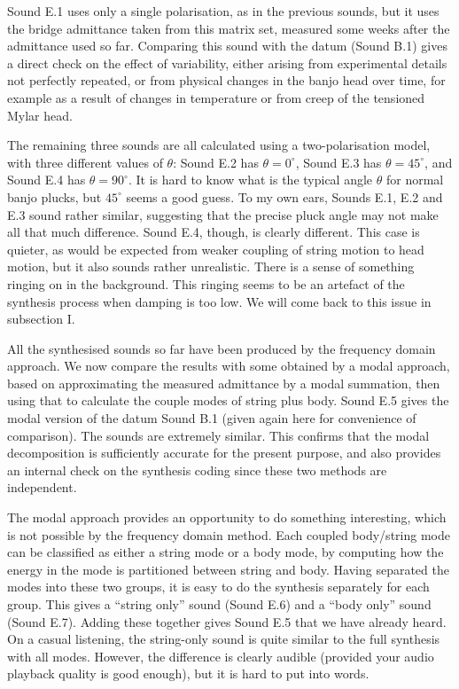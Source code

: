   Sound E.1 uses only a single polarisation, as in the previous sounds, but it 
  uses the bridge admittance taken from this matrix set, measured some weeks 
  after the admittance used so far. Comparing this sound with the datum (Sound 
  B.1) gives a direct check on the effect of variability, either arising from 
  experimental details not perfectly repeated, or from physical changes in the 
  banjo head over time, for example as a result of changes in temperature or 
  from creep of the tensioned Mylar head. 

  The remaining three sounds are all calculated using a two-polarisation model, 
  with three different values of $\theta$: Sound E.2 has $\theta = 0^\circ$, 
  Sound E.3 has $\theta = 45^\circ$, and Sound E.4 has $\theta = 90^\circ$. It 
  is hard to know what is the typical angle $\theta$ for normal banjo plucks, 
  but $45^\circ$ seems a good guess. To my own ears, Sounds E.1, E.2 and E.3 
  sound rather similar, suggesting that the precise pluck angle may not make 
  all that much difference. Sound E.4, though, is clearly different. This case 
  is quieter, as would be expected from weaker coupling of string motion to 
  head motion, but it also sounds rather unrealistic. There is a sense of 
  something ringing on in the background. This ringing seems to be an artefact 
  of the synthesis process when damping is too low. We will come back to this 
  issue in subsection I. 

  All the synthesised sounds so far have been produced by the frequency domain 
  approach. We now compare the results with some obtained by a modal approach, 
  based on approximating the measured admittance by a modal summation, then 
  using that to calculate the couple modes of string plus body. Sound E.5 gives 
  the modal version of the datum Sound B.1 (given again here for convenience of 
  comparison). The sounds are extremely similar. This confirms that the modal 
  decomposition is sufficiently accurate for the present purpose, and also 
  provides an internal check on the synthesis coding since these two methods 
  are independent. 

  The modal approach provides an opportunity to do something interesting, which 
  is not possible by the frequency domain method. Each coupled body/string mode 
  can be classified as either a string mode or a body mode, by computing how 
  the energy in the mode is partitioned between string and body. Having 
  separated the modes into these two groups, it is easy to do the synthesis 
  separately for each group. This gives a ``string only'' sound (Sound E.6) and 
  a ``body only'' sound (Sound E.7). Adding these together gives Sound E.5 that 
  we have already heard. On a casual listening, the string-only sound is quite 
  similar to the full synthesis with all modes. However, the difference is 
  clearly audible (provided your audio playback quality is good enough), but it 
  is hard to put into words. 

